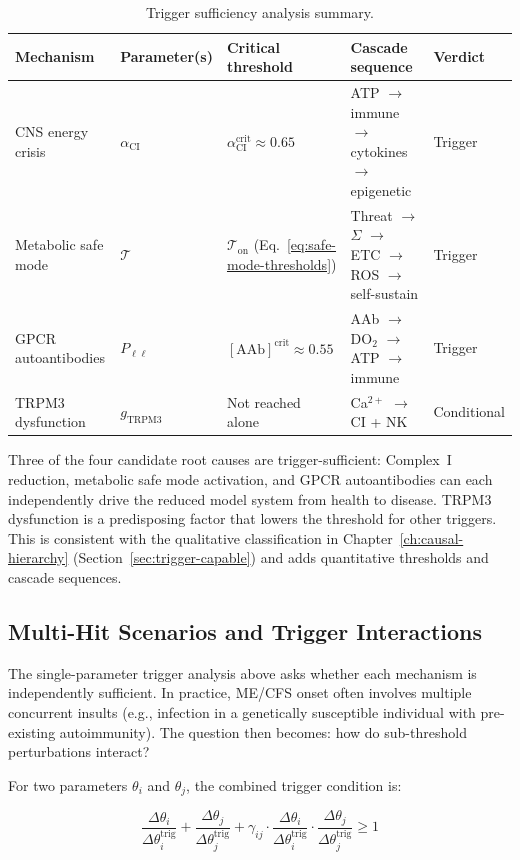 \begin{table}[htbp]
\centering
\caption{Trigger sufficiency analysis summary.}
\label{tab:trigger-summary}
\begin{tabular}{p{3.5cm}p{2.5cm}p{2.5cm}p{3cm}p{2cm}}
\hline
Mechanism & Parameter(s) & Critical threshold & Cascade sequence & Verdict \\
\hline
CNS energy crisis & $\alpha_{\text{CI}}$ & $\alpha_{\text{CI}}^{\mathrm{crit}} \approx 0.65$ & ATP $\to$ immune $\to$ cytokines $\to$ epigenetic & Trigger \\
Metabolic safe mode & $\mathcal{T}$ & $\mathcal{T}_{\text{on}}$ (Eq.~\ref{eq:safe-mode-thresholds}) & Threat $\to$ $\Sigma$ $\to$ ETC $\to$ ROS $\to$ self-sustain & Trigger \\
GPCR autoantibodies & $P_{\ell\ell}$ & $[\text{AAb}]^{\mathrm{crit}} \approx 0.55$ & AAb $\to$ DO$_2$ $\to$ ATP $\to$ immune & Trigger \\
TRPM3 dysfunction & $g_{\text{TRPM3}}$ & Not reached alone & Ca$^{2+}$ $\to$ CI + NK & Conditional \\
\hline
\end{tabular}
\end{table}

Three of the four candidate root causes are trigger-sufficient: Complex~I reduction, metabolic safe mode activation, and GPCR autoantibodies can each independently drive the reduced model system from health to disease. TRPM3 dysfunction is a predisposing factor that lowers the threshold for other triggers. This is consistent with the qualitative classification in Chapter~\ref{ch:causal-hierarchy} (Section~\ref{sec:trigger-capable}) and adds quantitative thresholds and cascade sequences.

\subsection{Multi-Hit Scenarios and Trigger Interactions}
\label{sec:multi-hit}

The single-parameter trigger analysis above asks whether each mechanism is independently sufficient. In practice, ME/CFS onset often involves multiple concurrent insults (e.g., infection in a genetically susceptible individual with pre-existing autoimmunity). The question then becomes: how do sub-threshold perturbations interact?

For two parameters $\theta_i$ and $\theta_j$, the combined trigger condition is:

\begin{equation}
\label{eq:multi-hit}
\frac{\Delta\theta_i}{\Delta\theta_i^{\mathrm{trig}}} + \frac{\Delta\theta_j}{\Delta\theta_j^{\mathrm{trig}}} + \gamma_{ij} \cdot \frac{\Delta\theta_i}{\Delta\theta_i^{\mathrm{trig}}} \cdot \frac{\Delta\theta_j}{\Delta\theta_j^{\mathrm{trig}}} \geq 1
\end{equation}


